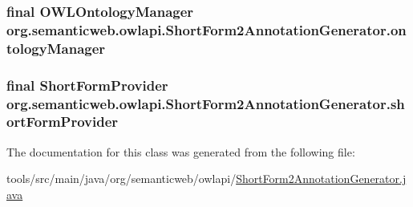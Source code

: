 \hypertarget{classorg_1_1semanticweb_1_1owlapi_1_1_short_form2_annotation_generator_a07ad54022df10cb12a53b5a51ce0a214}{
\subsubsection[{ontology\-Manager}]{\setlength{\rightskip}{0pt plus 5cm}final {\bf O\-W\-L\-Ontology\-Manager} org.\-semanticweb.\-owlapi.\-Short\-Form2\-Annotation\-Generator.\-ontology\-Manager\hspace{0.3cm}{\ttfamily [private]}}}\label{classorg_1_1semanticweb_1_1owlapi_1_1_short_form2_annotation_generator_a07ad54022df10cb12a53b5a51ce0a214}
\hypertarget{classorg_1_1semanticweb_1_1owlapi_1_1_short_form2_annotation_generator_aa43517d574c67137ab5762d82e650b64}{
\subsubsection[{short\-Form\-Provider}]{\setlength{\rightskip}{0pt plus 5cm}final {\bf Short\-Form\-Provider} org.\-semanticweb.\-owlapi.\-Short\-Form2\-Annotation\-Generator.\-short\-Form\-Provider\hspace{0.3cm}{\ttfamily [private]}}}\label{classorg_1_1semanticweb_1_1owlapi_1_1_short_form2_annotation_generator_aa43517d574c67137ab5762d82e650b64}


The documentation for this class was generated from the following file\-:\begin{DoxyCompactItemize}
\item 
tools/src/main/java/org/semanticweb/owlapi/\hyperlink{_short_form2_annotation_generator_8java}{Short\-Form2\-Annotation\-Generator.\-java}\end{DoxyCompactItemize}
